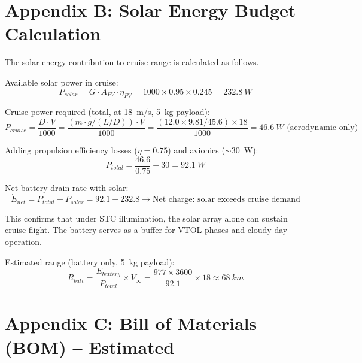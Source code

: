 \section*{Appendix B: Solar Energy Budget Calculation}

\noindent The solar energy contribution to cruise range is calculated as follows.

\noindent Available solar power in cruise:
\begin{equation}
    P_{solar} = G \cdot A_{PV} \cdot \eta_{PV} = 1000 \times 0.95 \times 0.245 = \SI{232.8}{W}
\end{equation}

\noindent Cruise power required (total, at 18~m/s, 5~kg payload):
\begin{equation}
    P_{cruise} = \frac{D \cdot V}{1000} = \frac{(m \cdot g / (L/D)) \cdot V}{1000} = \frac{(12.0 \times 9.81 / 45.6) \times 18}{1000} = \SI{46.6}{W} \text{ (aerodynamic only)}
\end{equation}

\noindent Adding propulsion efficiency losses ($\eta = 0.75$) and avionics ($\sim$30~W):
\begin{equation}
    P_{total} = \frac{46.6}{0.75} + 30 = \SI{92.1}{W}
\end{equation}

\noindent Net battery drain rate with solar:
\begin{equation}
    \dot{E}_{net} = P_{total} - P_{solar} = 92.1 - 232.8 \rightarrow \text{Net charge: solar exceeds cruise demand}
\end{equation}

\noindent This confirms that under STC illumination, the solar array alone can sustain cruise flight. The battery serves as a buffer for VTOL phases and cloudy-day operation.

\noindent Estimated range (battery only, 5~kg payload):
\begin{equation}
    R_{batt} = \frac{E_{battery}}{P_{total}} \times V_\infty = \frac{977 \times 3600}{92.1} \times 18 \approx \SI{68}{km}
\end{equation}

\section*{Appendix C: Bill of Materials (BOM) -- Estimated}

